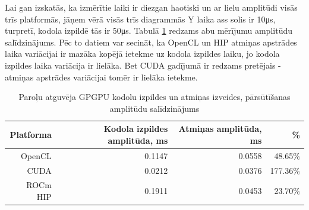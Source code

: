 Lai gan izskatās, ka izmērītie laiki ir diezgan haotiski un ar lielu amplitūdi
visās trīs platformās, jāņem vērā visās trīs diagrammās Y laika ass solis ir
10\si{\micro\second}, turpretī, kodola izpildē tās ir 50\si{\micro\second}.
Tabulā \ref{tab:amplitudas} redzams abu mērījumu amplitūdu salīdzinājums.
Pēc to datiem var secināt, ka OpenCL un HIP atmiņas apstrādes laika variācijai
ir mazāka kopējā ietekme uz kodola izpildes laiku, jo kodola izpildes laika
variācija ir lielāka. Bet CUDA gadījumā ir redzams pretējais - atmiņas apstrādes
variācijai tomēr ir lielāka ietekme.

\begin{table}[H]
    \centering
    \caption{Paroļu atguvēja GPGPU kodolu izpildes un atmiņas izveides,
    pārsūtīšanas amplitūdu salīdzinājums}
\label{tab:amplitudas}
\begin{tabular}{rrrr}
    Platforma & Kodola izpildes amplitūda, ms & Atmiņas amplitūda, ms& \% \\ \hline
OpenCL & 0.1147 & 0.0558 & 48.65\% \\
CUDA & 0.0212 & 0.0376 & 177.36\% \\
ROCm HIP & 0.1911 & 0.0453 & 23.70\% \\
\hline
\end{tabular}
\end{table}
